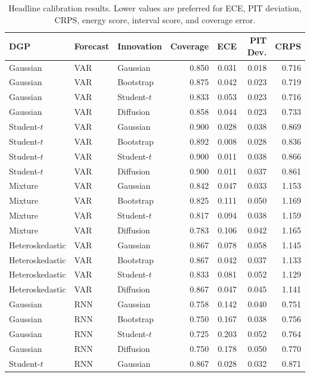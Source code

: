 \documentclass[11pt]{article}
\begin{document}
\begin{table}[H]
\centering
\caption{Headline calibration results. Lower values are preferred for ECE, PIT deviation, CRPS, energy score, interval score, and coverage error.}
\label{tab:calibration_results}
\small
\begin{tabular}{lllrrrr}
\toprule
DGP & Forecast & Innovation & Coverage & ECE & PIT Dev. & CRPS \\
\midrule
Gaussian & VAR & Gaussian & 0.850 & 0.031 & 0.018 & 0.716 \\
Gaussian & VAR & Bootstrap & 0.875 & 0.042 & 0.023 & 0.719 \\
Gaussian & VAR & Student-$t$ & 0.833 & 0.053 & 0.023 & 0.716 \\
Gaussian & VAR & Diffusion & 0.858 & 0.044 & 0.023 & 0.733 \\
\midrule
Student-$t$ & VAR & Gaussian & 0.900 & 0.028 & 0.038 & 0.869 \\
Student-$t$ & VAR & Bootstrap & 0.892 & 0.008 & 0.028 & 0.836 \\
Student-$t$ & VAR & Student-$t$ & 0.900 & 0.011 & 0.038 & 0.866 \\
Student-$t$ & VAR & Diffusion & 0.900 & 0.011 & 0.037 & 0.861 \\
\midrule
Mixture & VAR & Gaussian & 0.842 & 0.047 & 0.033 & 1.153 \\
Mixture & VAR & Bootstrap & 0.825 & 0.111 & 0.050 & 1.169 \\
Mixture & VAR & Student-$t$ & 0.817 & 0.094 & 0.038 & 1.159 \\
Mixture & VAR & Diffusion & 0.783 & 0.106 & 0.042 & 1.165 \\
\midrule
Heteroskedastic & VAR & Gaussian & 0.867 & 0.078 & 0.058 & 1.145 \\
Heteroskedastic & VAR & Bootstrap & 0.867 & 0.042 & 0.037 & 1.133 \\
Heteroskedastic & VAR & Student-$t$ & 0.833 & 0.081 & 0.052 & 1.129 \\
Heteroskedastic & VAR & Diffusion & 0.867 & 0.047 & 0.045 & 1.141 \\
\midrule
Gaussian & RNN & Gaussian & 0.758 & 0.142 & 0.040 & 0.751 \\
Gaussian & RNN & Bootstrap & 0.750 & 0.167 & 0.038 & 0.756 \\
Gaussian & RNN & Student-$t$ & 0.725 & 0.203 & 0.052 & 0.764 \\
Gaussian & RNN & Diffusion & 0.750 & 0.178 & 0.050 & 0.770 \\
\midrule
Student-$t$ & RNN & Gaussian & 0.867 & 0.028 & 0.032 & 0.871 \\

\end{tabular}
\end{table}
\end{document}
